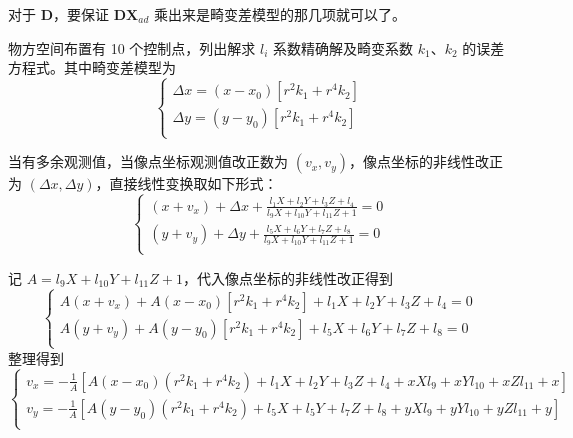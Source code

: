 \documentclass[a4paper]{ctexart}
\newtheorem{example}{\hskip 2em 例}
\newtheorem*{sol}{\hskip 2em 解}
\newtheorem*{tips}{\hskip 2em 注}
\begin{document}
\begin{tips}
对于 $\bm{D}$，要保证 $\bm{DX}_{ad}$ 乘出来是畸变差模型的那几项就可以了。
\end{tips}
\newpage
\begin{example}
物方空间布置有 10 个控制点，列出解求 $l_i$ 系数精确解及畸变系数 $k_1$、$k_2$ 的误差方程式。其中畸变差模型为
$$
\begin{cases}
	\Delta x=\left( x-x_0 \right) \left[ r^2k_1+r^4k_2 \right]\\
	\Delta y=\left( y-y_0 \right) \left[ r^2k_1+r^4k_2 \right]\\
\end{cases}
$$
\end{example}
\begin{sol}
当有多余观测值，当像点坐标观测值改正数为 $(v_x,v_y)$，像点坐标的非线性改正为 $(\Delta x,\Delta y)$，直接线性变换取如下形式：
$$
\begin{cases}
	\left( x+v_x \right) +\Delta x+\frac{l_1X+l_2Y+l_3Z+l_4}{l_9X+l_{10}Y+l_{11}Z+1}=0\\
	\left( y+v_y \right) +\Delta y+\frac{l_5X+l_6Y+l_7Z+l_8}{l_9X+l_{10}Y+l_{11}Z+1}=0\\
\end{cases}
$$

记 $A=l_9X+l_{10}Y+l_{11}Z+1$，代入像点坐标的非线性改正得到
$$
\begin{cases}
	A\left( x+v_x \right) +A\left( x-x_0 \right) \left[ r^2k_1+r^4k_2 \right] +l_1X+l_2Y+l_3Z+l_4=0\\
	A\left( y+v_y \right) +A\left( y-y_0 \right) \left[ r^2k_1+r^4k_2 \right] +l_5X+l_6Y+l_7Z+l_8=0\\
\end{cases}
$$
整理得到 
$$
\begin{cases}
	v_x=-\frac{1}{A}\left[ A\left( x-x_0 \right) \left( r^2k_1+r^4k_2 \right) +l_1X+l_2Y+l_3Z+l_4+xXl_9+xYl_{10}+xZl_{11}+x \right]\\
	v_y=-\frac{1}{A}\left[ A\left( y-y_0 \right) \left( r^2k_1+r^4k_2 \right) +l_5X+l_5Y+l_7Z+l_8+yXl_9+yYl_{10}+yZl_{11}+y \right]\\
\end{cases}
$$


\end{sol}
\end{document}

